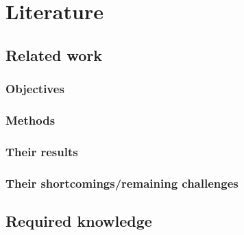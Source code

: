 \chapter{Literature} 
\label{chapter:Arch}

\section{Related work}

\subsection{Objectives}
\subsection{Methods}
\subsection{Their results}
\subsection{Their shortcomings/remaining challenges}


\section{Required knowledge}